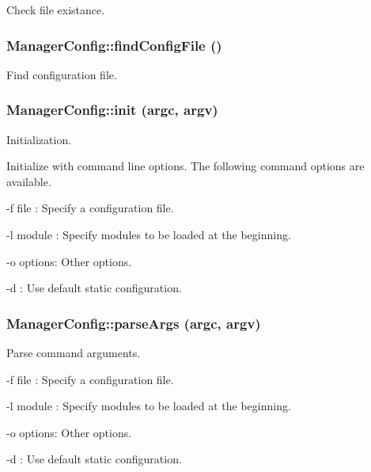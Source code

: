 Check file existance. 

\subsubsection{\setlength{\rightskip}{0pt plus 5cm}Manager\-Config::find\-Config\-File ()}\label{classManagerConfig_ManagerConfiga5}


Find configuration file. 

\subsubsection{\setlength{\rightskip}{0pt plus 5cm}Manager\-Config::init (argc, argv)}\label{classManagerConfig_ManagerConfiga2}


Initialization. 

Initialize with command line options. The following command options are available.

-f file : Specify a configuration file. \par
 -l module : Specify modules to be loaded at the beginning. \par
 -o options: Other options. \par
 -d : Use default static configuration. \par
{}
\subsubsection{\setlength{\rightskip}{0pt plus 5cm}Manager\-Config::parse\-Args (argc, argv)}\label{classManagerConfig_ManagerConfiga4}


Parse command arguments. 

-f file : Specify a configuration file. \par
 -l module : Specify modules to be loaded at the beginning. \par
 -o options: Other options. \par
 -d : Use default static configuration. \par
{}
